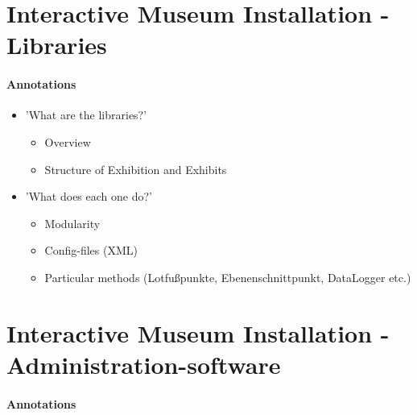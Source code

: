 
\section{Interactive Museum Installation - Libraries}
\label{implementation_libraries}

\paragraph{Annotations}

\begin{itemize}
	\item 'What are the libraries?'
	\begin{itemize}
		\item Overview
		\item Structure of Exhibition and Exhibits
	\end{itemize}
	\item 'What does each one do?'
	\begin{itemize}
		\item Modularity
		\item Config-files (XML)
		\item Particular methods (Lotfußpunkte, Ebenenschnittpunkt, DataLogger etc.)
	\end{itemize}
\end{itemize}



\section{Interactive Museum Installation - Administration-software}
\label{implementation_administration}

\paragraph{Annotations}

